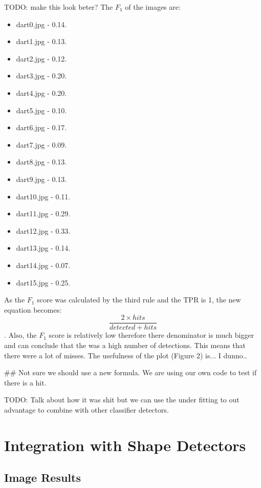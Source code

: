 \documentclass[a4paper]{article}
\begin{document}
TODO: make this look beter?
The \(F_{1}\) of the images are:
\begin{multicols}{4}
    \begin{itemize}
		\item dart0.jpg - 0.14.
        \item dart1.jpg - 0.13.
        \item dart2.jpg - 0.12.
        \item dart3.jpg - 0.20.
        \item dart4.jpg - 0.20.
        \item dart5.jpg - 0.10.
        \item dart6.jpg - 0.17.
        \item dart7.jpg - 0.09.
        \item dart8.jpg - 0.13.
        \item dart9.jpg - 0.13.
        \item dart10.jpg - 0.11.
        \item dart11.jpg - 0.29.
        \item dart12.jpg - 0.33.
        \item dart13.jpg - 0.14.
        \item dart14.jpg - 0.07.
        \item dart15.jpg - 0.25.
    \end{itemize}
\end{multicols}

As the \(F_{1}\) score was calculated by the third rule and the TPR is 1, the
new equation becomes: \[\frac{2 \times hits}{detected + hits}\]. Also, the
\(F_{1}\) score is relatively low therefore there denominator is much bigger
and can conclude that the was a high number of detections. This means that
there were a lot of misses. The usefulness of the plot (Figure 2) is... I
dunno..

## Not sure we should use a new formula. We are using our own code to test if
there is a hit.

TODO: Talk about how it was shit but we can use the under fitting to out
advantage to combine with other classifier detectors.

\section{Integration with Shape Detectors}
\subsection*{Image Results}
\end{document}
